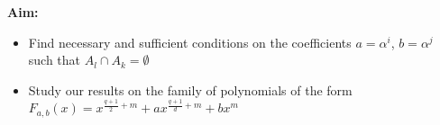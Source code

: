 \documentclass[landscape,final,paperwidth=48in,paperheight=38in]{baposter}
\begin{document}
\begin{poster}
{    \textbf{Aim:}

    \begin{itemize}
      \item Find necessary and sufficient conditions on the coefficients $a=\alpha^i$, $b=\alpha^j$ such that $A_l \cap A_k = \emptyset$
      \item Study our results on the family of polynomials of the form $F_{a,b}(x) = x^{\frac{q+1}{2}+m} + a x^{\frac{q+1}{d}+m} + b x^{m}$
    \end{itemize}


   \vspace{0.3em}
  }\label{Future Work}

  \label{References}

\end{poster}
\end{document}
